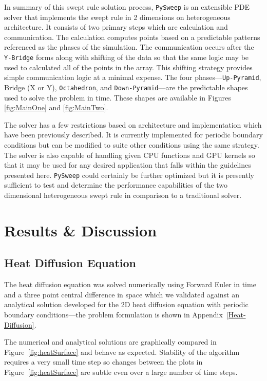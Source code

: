 \documentclass[review]{elsarticle}
\def\pysweep{\texttt{PySweep}}
\def\Up{\texttt{Up-Pyramid}}
\def\Down{\texttt{Down-Pyramid}}
\def\Oct{\texttt{Octahedron}}
\def\Yb{\texttt{Y-Bridge}}
\begin{document}
\par
In summary of this swept rule solution process, \pysweep{} is an extensible PDE solver that implements the swept rule in 2 dimensions on heterogeneous architecture. It consists of two primary steps which are calculation and communication. The calculation computes points based on a predictable patterns referenced as the phases of the simulation. The communication occurs after the \Yb{} forms along with shifting of the data so that the same logic may be used to calculated all of the points in the array. This shifting strategy provides simple communication logic at a minimal expense. The four phases---\Up{}, Bridge (X or Y), \Oct{}, and \Down{}---are the predictable shapes used to solve the problem in time. These shapes are available in Figures \ref{fig:MainOne} and \ref{fig:MainTwo}. 
\par
The solver has a few restrictions based on architecture and implementation which have been previously described. It is currently implemented for periodic boundary conditions but can be modified to suite other conditions using the same strategy. The solver is also capable of handling given CPU functions and GPU kernels so that it may be used for any desired application that falls within the guidelines presented here. \pysweep{} could certainly be further optimized but it is presently sufficient to test and determine the performance capabilities of the two dimensional heterogeneous swept rule in comparison to a traditional solver.

\section{Results \& Discussion}
\label{results-section}


\subsection{Heat Diffusion Equation}
\label{hdeResults}
The heat diffusion equation was solved numerically using Forward Euler in time and a three point central difference in space which we validated against an analytical solution developed for the 2D heat diffusion equation with periodic boundary conditions---the problem formulation is shown in Appendix~\ref{Heat-Diffusion}.

The numerical and analytical solutions are graphically compared in Figure~\ref{fig:heatSurface} and behave as expected. Stability of the algorithm requires a very small time step so changes between the plots in Figure~\ref{fig:heatSurface} are subtle even over a large number of time steps.
\end{document}
